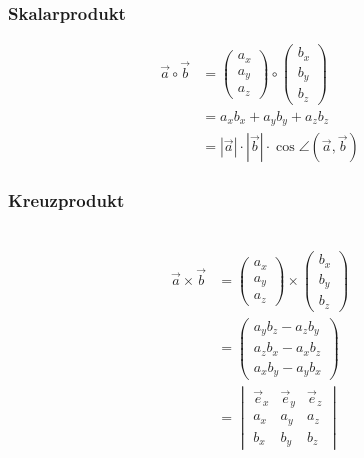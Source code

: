 \begin{multicols}{2}
\subsubsection*{Skalarprodukt}
\begin{align*} 
\vec{a}\circ\vec{b} &= \begin{pmatrix}a_x\\ a_y\\a_z\end{pmatrix}\circ\begin{pmatrix}b_x\\ b_y\\b_z\end{pmatrix}\\
&=a_xb_x+a_yb_y+a_zb_z\\
&=|\vec{a}|\cdot|\vec{b}|\cdot \cos\angle(\vec{a},\vec{b})
\end{align*}
\vfill
\subsubsection*{Kreuzprodukt}
\\
\begin{align*} 
\vec{a}\times\vec{b} &= \begin{pmatrix}a_x\\ a_y\\a_z\end{pmatrix}\times\begin{pmatrix}b_x\\ b_y\\b_z\end{pmatrix}\\
&=\begin{pmatrix}a_yb_z-a_zb_y\\ a_zb_x-a_xb_z\\a_xb_y-a_yb_x\end{pmatrix}\\
&=\begin{vmatrix}\vec{e}_x&\vec{e}_y&\vec{e}_z\\a_x&a_y&a_z\\b_x&b_y&b_z\end{vmatrix}
\end{align*}
\vfill
\end{multicols}

